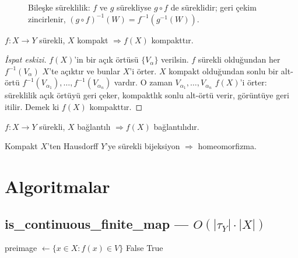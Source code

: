 \begin{figure}[ht]
  \centering
  
  \caption{Bileşke süreklilik: $f$ ve $g$ sürekliyse $g\circ f$ de süreklidir;
    geri çekim zincirlenir, $(g\circ f)^{-1}(W) = f^{-1}(g^{-1}(W))$.}
  \label{fig:ch10:bileske}
\end{figure}

\begin{theorem}
$f: X \to Y$ sürekli, $X$ kompakt $\Rightarrow f(X)$ kompakttır.
\begin{proof}[İspat eskizi]
$f(X)$'in bir açık örtüsü $\{V_\alpha\}$ verilsin. $f$ sürekli olduğundan her
$f^{-1}(V_\alpha)$ $X$'te açıktır ve bunlar $X$'i örter. $X$ kompakt olduğundan
sonlu bir alt-örtü $f^{-1}(V_{\alpha_1}), \dots, f^{-1}(V_{\alpha_n})$ vardır.
O zaman $V_{\alpha_1}, \dots, V_{\alpha_n}$ $f(X)$'i örter: süreklilik açık
örtüyü geri çeker, kompaktlık sonlu alt-örtü verir, görüntüye geri itilir.
Demek ki $f(X)$ kompakttır.
\end{proof}
\end{theorem}

\begin{theorem}
$f: X \to Y$ sürekli, $X$ bağlantılı $\Rightarrow f(X)$ bağlantılıdır.
\end{theorem}

\begin{theorem}
Kompakt $X$'ten Hausdorff $Y$'ye sürekli bijeksiyon $\Rightarrow$ homeomorfizma.
\end{theorem}

\section{Algoritmalar}

\subsection{is\_continuous\_finite\_map — $O(|\tau_Y| \cdot |X|)$}

\begin{algorithm}
\caption{IsContinuous$(X, \tau_X, Y, \tau_Y, f)$}
\begin{algorithmic}[1]
    \State preimage $\leftarrow \{x \in X : f(x) \in V\}$
        \State \Return False
    \EndIf
\EndFor
\State \Return True
\end{algorithmic}
\end{algorithm}

